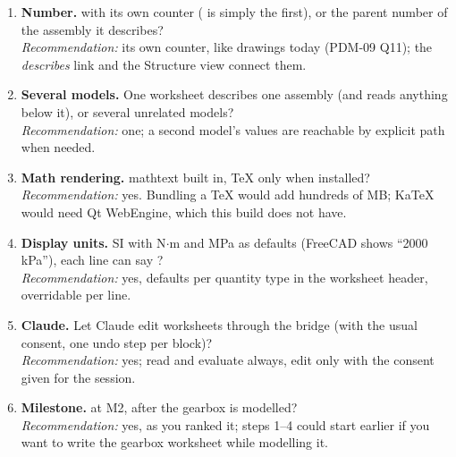 \begin{enumerate}
        \emph{Recommendation:} on its own; an ECO that opens the assembly lists the spec as affected, ticked when its
        inputs changed.
  \item \textbf{Number.}  with its own counter ( is simply the first), or
        the parent number of the assembly it describes?\\
        \emph{Recommendation:} its own counter, like drawings today (PDM-09 Q11); the \emph{describes} link and the
        Structure view connect them.
  \item \textbf{Several models.} One worksheet describes one assembly (and reads anything below it), or several
        unrelated models?\\
        \emph{Recommendation:} one; a second model's values are reachable by explicit path when needed.
  \item \textbf{Math rendering.} mathtext built in, TeX only when installed?\\
        \emph{Recommendation:} yes. Bundling a TeX would add hundreds of MB; KaTeX would need Qt WebEngine, which this
        build does not have.
  \item \textbf{Display units.} SI with N$\cdot$m and MPa as defaults (FreeCAD shows ``2000 kPa''), each line can say
        ?\\
        \emph{Recommendation:} yes, defaults per quantity type in the worksheet header, overridable per line.
  \item \textbf{Claude.} Let Claude edit worksheets through the bridge (with the usual consent, one undo step per
        block)?\\
        \emph{Recommendation:} yes; read and evaluate always, edit only with the consent given for the session.
  \item \textbf{Milestone.}  at M2, after the gearbox is modelled?\\
        \emph{Recommendation:} yes, as you ranked it; steps 1--4 could start earlier if you want to write the gearbox
        worksheet while modelling it.
\end{enumerate}
